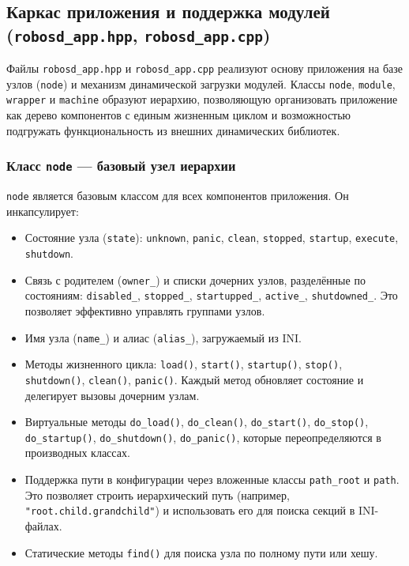 \documentclass[a4paper,12pt]{article}
\begin{document}
\subsection{Каркас приложения и поддержка модулей (\texttt{robosd\_app.hpp}, \texttt{robosd\_app.cpp})}

Файлы \texttt{robosd\_app.hpp} и \texttt{robosd\_app.cpp} реализуют основу приложения на базе узлов (\texttt{node}) и механизм динамической загрузки модулей. Классы \texttt{node}, \texttt{module}, \texttt{wrapper} и \texttt{machine} образуют иерархию, позволяющую организовать приложение как дерево компонентов с единым жизненным циклом и возможностью подгружать функциональность из внешних динамических библиотек.

\subsubsection{Класс \texttt{node} — базовый узел иерархии}

\texttt{node} является базовым классом для всех компонентов приложения. Он инкапсулирует:

\begin{itemize}
    \item Состояние узла (\texttt{state}): \texttt{unknown}, \texttt{panic}, \texttt{clean}, \texttt{stopped}, \texttt{startup}, \texttt{execute}, \texttt{shutdown}.
    \item Связь с родителем (\texttt{owner\_}) и списки дочерних узлов, разделённые по состояниям: \texttt{disabled\_}, \texttt{stopped\_}, \texttt{startupped\_}, \texttt{active\_}, \texttt{shutdowned\_}. Это позволяет эффективно управлять группами узлов.
    \item Имя узла (\texttt{name\_}) и алиас (\texttt{alias\_}), загружаемый из INI.
    \item Методы жизненного цикла: \texttt{load()}, \texttt{start()}, \texttt{startup()}, \texttt{stop()}, \texttt{shutdown()}, \texttt{clean()}, \texttt{panic()}. Каждый метод обновляет состояние и делегирует вызовы дочерним узлам.
    \item Виртуальные методы \texttt{do\_load()}, \texttt{do\_clean()}, \texttt{do\_start()}, \texttt{do\_stop()}, \texttt{do\_startup()}, \texttt{do\_shutdown()}, \texttt{do\_panic()}, которые переопределяются в производных классах.
    \item Поддержка пути в конфигурации через вложенные классы \texttt{path\_root} и \texttt{path}. Это позволяет строить иерархический путь (например, \texttt{"root.child.grandchild"}) и использовать его для поиска секций в INI-файлах.
    \item Статические методы \texttt{find()} для поиска узла по полному пути или хешу.
\end{itemize}
\end{document}
